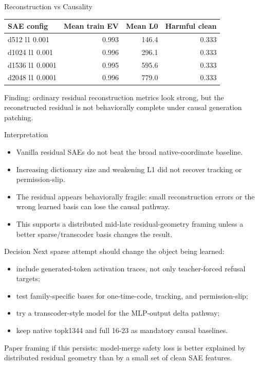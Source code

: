 \documentclass[aspectratio=169]{beamer}
\begin{document}
\begin{frame}{Reconstruction vs Causality}
  \small
  \begin{tabular}{lrrr}
    \toprule
    SAE config & Mean train EV & Mean L0 & Harmful clean \\
    \midrule
    d512 l1 0.001 & 0.993 & 146.4 & 0.333 \\
    d1024 l1 0.001 & 0.996 & 296.1 & 0.333 \\
    d1536 l1 0.0001 & 0.995 & 595.6 & 0.333 \\
    d2048 l1 0.0001 & 0.996 & 779.0 & 0.333 \\
    \bottomrule
  \end{tabular}

  \vspace{0.9em}
  Finding: ordinary residual reconstruction metrics look strong, but the reconstructed residual is not behaviorally complete under causal generation patching.
\end{frame}

\begin{frame}{Interpretation}
  \begin{itemize}
    \item Vanilla residual SAEs do not beat the broad native-coordinate baseline.
    \item Increasing dictionary size and weakening L1 did not recover tracking or permission-slip.
    \item The residual appears behaviorally fragile: small reconstruction errors or the wrong learned basis can lose the causal pathway.
    \item This supports a distributed mid-late residual-geometry framing unless a better sparse/transcoder basis changes the result.
  \end{itemize}
\end{frame}

\begin{frame}{Decision}
  Next sparse attempt should change the object being learned:
  \begin{itemize}
    \item include generated-token activation traces, not only teacher-forced refusal targets;
    \item test family-specific bases for one-time-code, tracking, and permission-slip;
    \item try a transcoder-style model for the MLP-output delta pathway;
    \item keep native topk1344 and full 16-23 as mandatory causal baselines.
  \end{itemize}

  \vspace{0.6em}
  Paper framing if this persists: model-merge safety loss is better explained by distributed residual geometry than by a small set of clean SAE features.
\end{frame}
\end{document}
